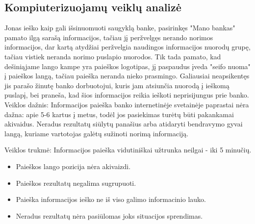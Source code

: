 \documentclass{VUMIFPSkursinis}
\begin{document}
\subsection{Kompiuterizuojamų veiklų analizė}
Jonas ieško kaip gali išsinuomuoti saugyklą banke, pasirinkęs "Mano bankas" pamato ilgą sarašą informacijos, tačiau jį peržvelgęs nerando norimos informacijos, dar kartą atydžiai peržvelgia naudingos informacijos nuorodų grupę, tačiau vistiek neranda norimo puslapio nuorodos. Tik tada pamato, kad dešiniąjame lango kampe yra paieškos logotipas, jį paspaudus įveda "seifo nuoma" į paieškos langą, tačiau paieška neranda nieko prasmingo. Galiausiai neapsikentęs jis parašo žinutę banko dorbuotojui, kuris jam atsiunčia nuorodą į ieškomą puslapį, bei praneša, kad šios informacijos reikia ieškoti neprisijungus prie banko. 
Veiklos dažnis: Informacijos paieška banko internetinėje svetainėje paprastai nėra dažna: apie 5-6 kartus į metus, todėl jos pasiekimas turėtų būti pakankamai akivaidus. Neradus rezultatų siūlytų panašius arba atidaryti bendravymo gyvai langą, kuriame vartotojas galėtų sužinoti norimą informaciją. \par
Veiklos trukmė: Informacijos paieška vidutiniškai užtrunka neilgai - iki 5 minučių.
\begin{itemize}
	\item Paieškos lango pozicija nėra akivaizdi.
	\item Paieškos rezultatų negalima sugrupuoti.
	\item Paieška informacijos ieško ne iš viso galimo informacinio lauko.
	\item Neradus rezultatų nėra pasiūlomas joks situacijos sprendimas.
\end{itemize}
\end{document}
